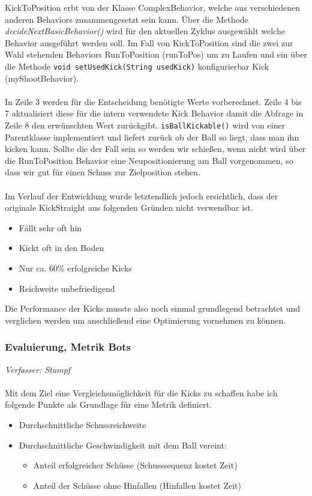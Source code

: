\documentclass[fontsize=12pt,a4paper,final]{scrartcl}[2003/01/01]
\begin{document}
KickToPosition erbt von der Klasse ComplexBehavior, welche aus verschiedenen anderen Behaviors zusammengesetzt sein kann. Über die Methode \textit{decideNextBasicBehavior()} wird für den aktuellen Zyklus ausgewählt welche Behavior ausgeführt werden soll. Im Fall von KickToPosition sind die zwei zur Wahl stehenden Behaviors  RunToPosition (runToPos) um zu Laufen und ein über die Methode \texttt{void setUsedKick(String usedKick)} konfigurierbar Kick (myShootBehavior).\\
\\
In Zeile 3 werden für die Entscheidung benötigte Werte vorberechnet. Zeile 4 bis 7 aktualisiert diese für die intern verwendete Kick Behavior damit die Abfrage in Zeile 8 den erwünschten Wert zurückgibt.  \texttt{isBallKickable()} wird von einer Parentklasse implementiert und liefert zurück ob der Ball so liegt, dass man ihn kicken kann. Sollte die der Fall sein so werden wir schießen, wenn nicht wird über die RunToPosition Behavior eine Neupositionierung am Ball vorgenommen, so dass wir gut für einen Schuss zur Zielposition stehen.\\
\\
Im Verlauf der Entwicklung wurde letztendlich jedoch ersichtlich, dass der originale KickStraight aus folgenden Gründen nicht verwendbar ist.
\begin{itemize}
\item Fällt sehr oft hin
\item Kickt oft in den Boden
\item Nur ca. 60\% erfolgreiche Kicks
\item Reichweite unbefriedigend
\end{itemize}
Die Performance der Kicks musste also noch einmal grundlegend betrachtet und verglichen werden um anschließend eine Optimierung vornehmen zu können.
\subsubsection{Evaluierung, Metrik Bots}
\textit{Verfasser: Stumpf}\\
\\
Mit dem Ziel eine Vergleichsmöglichkeit für die Kicks zu schaffen habe ich folgende Punkte als Grundlage für eine Metrik definiert.

\begin{itemize}
\item Durchschnittliche Schussreichweite
\item Durchschnittliche Geschwindigkeit mit dem Ball vereint:
	\begin{itemize}
	\item Anteil erfolgreicher Schüsse (Schusssequenz kostet Zeit)
	\item Anteil der Schüsse ohne Hinfallen (Hinfallen kostet Zeit)
	\end{itemize}
\end{itemize}
\end{document}
